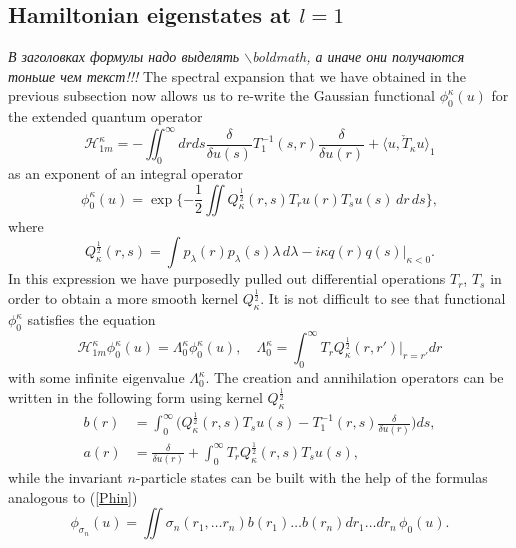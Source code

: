 \documentclass[12pt]{article}
\newcommand{\HH}{\mathscr{H}}
\begin{document}
\subsection{Hamiltonian eigenstates at
$ l=1 $}
\emph{\small В заголовках формулы надо выделять $\backslash$boldmath, а иначе они получаются тоньше чем текст!!!}
	The spectral expansion that we have obtained in the previous subsection
	now allows us to re-write the Gaussian functional
$ \phi_{0}^{\kappa}(u) $
	for the extended quantum operator
\begin{equation*}
    \HH_{1m}^{\kappa} = -\iint_{0}^{\infty} dr ds
    \frac{\delta}{\delta u(s)} T_{1}^{-1}(s,r)
	\frac{\delta}{\delta u(r)}
	+ \langle u, \check{T}_{\kappa}u\rangle_{1}
\end{equation*}
	as an exponent of an integral operator
\begin{equation*}
    \phi_{0}^{\kappa}(u)
	= \exp\{-\frac{1}{2} \iint Q_{\kappa}^{\frac{1}{2}}(r,s)
	T_{r}u(r) T_{s}u(s) \, dr\,ds\} ,
\end{equation*}
	where
\begin{equation*}
    Q_{\kappa}^{\frac{1}{2}}(r,s) = \int p_{\lambda}(r) p_{\lambda}(s)
	\lambda\,d\lambda - i\kappa q(r)q(s) \bigr|_{\kappa <0} .
\end{equation*}
	In this expression we have purposedly pulled out differential operations
$ T_{r} $, 
$ T_{s} $
	in order to obtain a more smooth kernel
$ Q_{\kappa}^{\frac{1}{2}} $.
	It is not difficult to see that functional
$ \phi_{0}^{\kappa} $
	satisfies the equation
\begin{equation*}
    \HH_{1m}^{\kappa} \phi_{0}^{\kappa}(u)
	= \Lambda_{0}^{\kappa} \phi_{0}^{\kappa}(u) ,\quad
    \Lambda_{0}^{\kappa} = \int_{0}^{\infty} T_{r}
	Q_{\kappa}^{\frac{1}{2}}(r,r') |_{r=r'} dr
\end{equation*}
	with some infinite eigenvalue
$ \Lambda_{0}^{\kappa} $.
	The creation and annihilation operators can be
	written in the following form using kernel
$ Q_{\kappa}^{\frac{1}{2}} $
\begin{align*}
    b(r) &= \int_{0}^{\infty} \bigl( Q_{\kappa}^{\frac{1}{2}}(r,s)T_{s}u(s)
	- T_{1}^{-1}(r,s) \frac{\delta}{\delta u(r)} \bigr) ds , \\
    a(r) &= \frac{\delta}{\delta u(r)} + \int_{0}^{\infty} 
	T_{r} Q_{\kappa}^{\frac{1}{2}}(r,s) T_{s} u(s) ,
\end{align*}
	while the invariant
$ n $-particle states can be built with the help of the formulas analogous to
(\ref{Phin})
\begin{equation*}
    \phi_{\sigma_{n}}(u) = \iint
    \sigma_{n} (r_{1},\ldots r_{n})
	b(r_{1}) \ldots b(r_{n})
    dr_{1} \ldots dr_{n} \, \phi_{0}(u) .
\end{equation*}
\end{document}
